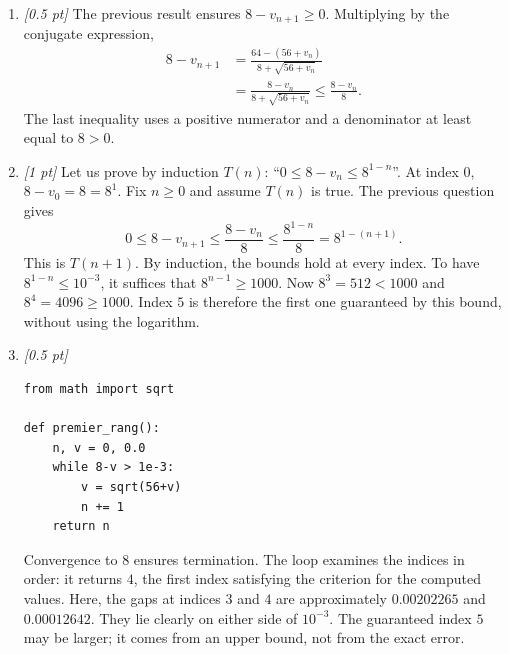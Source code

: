 \begin{enumerate}
\item \textit{[0.5 pt]} The previous result ensures $8-v_{n+1}\ge0$. Multiplying by the conjugate expression,
\[\begin{aligned}8-v_{n+1}&=\frac{64-(56+v_n)}{8+\sqrt{56+v_n}}\\&=\frac{8-v_n}{8+\sqrt{56+v_n}}\le\frac{8-v_n}{8}.\end{aligned}\]
The last inequality uses a positive numerator and a denominator at least equal to $8>0$.

\item \textit{[1 pt]} Let us prove by induction $T(n)$: ``$0\le 8-v_n\le 8^{1-n}$''.
At index $0$, $8-v_0=8=8^1$. Fix $n\ge0$ and assume $T(n)$ is true. The previous question gives
\[0\le 8-v_{n+1}\le\frac{8-v_n}{8}\le\frac{8^{1-n}}{8}=8^{1-(n+1)}.\]
This is $T(n+1)$. By induction, the bounds hold at every index.
To have $8^{1-n}\le10^{-3}$, it suffices that $8^{n-1}\ge1000$.
Now $8^{3}=512<1000$ and $8^{4}=4096\ge1000$. Index $5$ is therefore the first one guaranteed by this bound, without using the logarithm.


\item \textit{[0.5 pt]} 
\begin{lstlisting}
from math import sqrt

def premier_rang():
    n, v = 0, 0.0
    while 8-v > 1e-3:
        v = sqrt(56+v)
        n += 1
    return n
\end{lstlisting}
Convergence to $8$ ensures termination. The loop examines the indices in order: it returns $4$, the first index satisfying the criterion for the computed values. Here, the gaps at indices $3$ and $4$ are approximately $\num{0,00202265}$ and $\num{0,00012642}$. They lie clearly on either side of $10^{-3}$. The guaranteed index $5$ may be larger; it comes from an upper bound, not from the exact error.

\end{enumerate}

